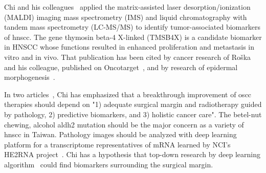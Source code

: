 \documentclass[12pt, a4paper]{article}
\begin{document}
\begin{CJK*}{UTF8}{bkai}
\begin{outline}
\end{outline}

Chi and his colleagues~\citep{Chi2017} applied the matrix-assisted laser desorption/ionization (MALDI) imaging mass spectrometry (IMS) and liquid chromatography with tandem mass spectrometry (LC-MS/MS) to identify tumor-associated biomarkers of \acrshort{hnscc}. The gene thymosin beta-4 X-linked (TMSB4X) is a candidate biomarker in HNSCC whose functions resulted in enhanced proliferation and metastasis in vitro and in vivo.
That publication has been cited by cancer research of Roška and his colleague, published on Oncotarget~\citep{Roska2020, Chu2019a, Makowiecka2019a}, and by research of epidermal morphogenesis~\citep{Padmanabhan2020}.

In two articles~\citep{Chi2021, Chi2022}, Chi has emphasized that a breakthrough improvement of \acrshort{oscc} therapies should depend on "1) adequate surgical margin and radiotherapy guided by pathology, 2) predictive biomarkers, and 3) holistic cancer care". 
The betel-nut chewing, alcohol \acrfull{aldh2} mutation should be the major concern as a variety of \acrshort{hnscc} in Taiwan.
Pathology images should be analyzed with deep learning platform for a transcriptome representatives of mRNA learned by NCI's HE2RNA project~\citep{Schmauch2020}. Chi has a hypothesis that top-down research by deep learning algorithm~\citep{Huang2020} could find biomarkers surrounding the surgical margin.

\end{CJK*}
\end{document}
